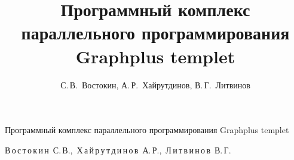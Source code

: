 % 

%


%



%

% 



\renewcommand{\baselinestretch}{0.89}



\renewcommand{\firstpage}{146}

\renewcommand{\lastpage}{153}



















\title{Программный комплекс параллельного программирования Graphplus templet}%

{Программный комплекс параллельного программирования  Graphplus templet}%



\author{С.\,В.~Востокин, А.\,Р.~Хайрутдинов, В.\,Г.~Литвинов}%

{В\,о\,с\,т\,о\,к\,и\,н~С.\,В.,\ Х\,а\,й\,р\,у\,т\,д\,и\,н\,о\,в~А.\,Р.,\ Л\,и\,т\,в\,и\,н\,о\,в~В.\,Г.}%










